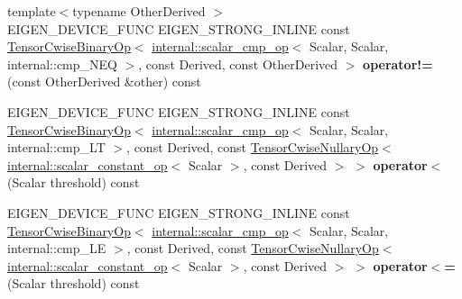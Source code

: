 \begin{DoxyCompactItemize}
{\footnotesize template$<$typename Other\+Derived $>$ }\\E\+I\+G\+E\+N\+\_\+\+D\+E\+V\+I\+C\+E\+\_\+\+F\+U\+NC E\+I\+G\+E\+N\+\_\+\+S\+T\+R\+O\+N\+G\+\_\+\+I\+N\+L\+I\+NE const \hyperlink{class_eigen_1_1_tensor_cwise_binary_op}{Tensor\+Cwise\+Binary\+Op}$<$ \hyperlink{struct_eigen_1_1internal_1_1scalar__cmp__op}{internal\+::scalar\+\_\+cmp\+\_\+op}$<$ Scalar, Scalar, internal\+::cmp\+\_\+\+N\+EQ $>$, const Derived, const Other\+Derived $>$ {\bfseries operator!=} (const Other\+Derived \&other) const
\item 
\mbox{\label{class_eigen_1_1_tensor_base_3_01_derived_00_01_read_only_accessors_01_4_a78093d6a8eff74ba16d8253bff2dabb7}} 
E\+I\+G\+E\+N\+\_\+\+D\+E\+V\+I\+C\+E\+\_\+\+F\+U\+NC E\+I\+G\+E\+N\+\_\+\+S\+T\+R\+O\+N\+G\+\_\+\+I\+N\+L\+I\+NE const \hyperlink{class_eigen_1_1_tensor_cwise_binary_op}{Tensor\+Cwise\+Binary\+Op}$<$ \hyperlink{struct_eigen_1_1internal_1_1scalar__cmp__op}{internal\+::scalar\+\_\+cmp\+\_\+op}$<$ Scalar, Scalar, internal\+::cmp\+\_\+\+LT $>$, const Derived, const \hyperlink{class_eigen_1_1_tensor_cwise_nullary_op}{Tensor\+Cwise\+Nullary\+Op}$<$ \hyperlink{struct_eigen_1_1internal_1_1scalar__constant__op}{internal\+::scalar\+\_\+constant\+\_\+op}$<$ Scalar $>$, const Derived $>$ $>$ {\bfseries operator$<$} (Scalar threshold) const
\item 
\mbox{\label{class_eigen_1_1_tensor_base_3_01_derived_00_01_read_only_accessors_01_4_ac87ee552127e6a3905d8bb870ca106ca}} 
E\+I\+G\+E\+N\+\_\+\+D\+E\+V\+I\+C\+E\+\_\+\+F\+U\+NC E\+I\+G\+E\+N\+\_\+\+S\+T\+R\+O\+N\+G\+\_\+\+I\+N\+L\+I\+NE const \hyperlink{class_eigen_1_1_tensor_cwise_binary_op}{Tensor\+Cwise\+Binary\+Op}$<$ \hyperlink{struct_eigen_1_1internal_1_1scalar__cmp__op}{internal\+::scalar\+\_\+cmp\+\_\+op}$<$ Scalar, Scalar, internal\+::cmp\+\_\+\+LE $>$, const Derived, const \hyperlink{class_eigen_1_1_tensor_cwise_nullary_op}{Tensor\+Cwise\+Nullary\+Op}$<$ \hyperlink{struct_eigen_1_1internal_1_1scalar__constant__op}{internal\+::scalar\+\_\+constant\+\_\+op}$<$ Scalar $>$, const Derived $>$ $>$ {\bfseries operator$<$=} (Scalar threshold) const
\item 
\mbox{\label{class_eigen_1_1_tensor_base_3_01_derived_00_01_read_only_accessors_01_4_abb75895dbc6086b41d88d12ac958a7e4}} 

\end{DoxyCompactItemize}
